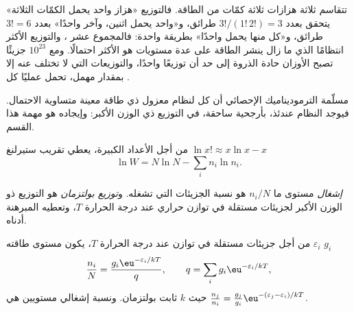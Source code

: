 \begin{example}\label{ex:b3:partition-functions:three-quanta}
تتقاسم ثلاثة هزازات ثلاثة كمّات من الطاقة. فالتوزيع «هزاز
واحد يحمل الكمّات الثلاثة» يتحقق بعدد $3!/(1!\,2!) = 3$ طرائق، و«واحد
يحمل اثنين، وآخر واحدًا» بعدد $3! = 6$ طرائق، و«كل منها يحمل واحدًا» بطريقة واحدة:
فالمجموع عشر ، والتوزيع الأكثر انتظامًا الذي ما زال ينشر
الطاقة على عدة مستويات هو الأكثر احتمالًا. ومع $10^{23}$ جزيئًا تصبح
الأوزان حادة الذروة إلى حد أن توزيعًا واحدًا، والتوزيعات التي لا تختلف
عنه إلا بمقدار مهمل، تحمل عمليًا كل .
\end{example}

\begin{remark}
مسلّمة الترموديناميك الإحصائي أن كل  لنظام
معزول ذي طاقة معينة متساوية الاحتمال. فيوجد النظام عندئذ،
بأرجحية ساحقة، في التوزيع ذي الوزن الأكبر: وإيجاده هو
مهمة هذا القسم.
\end{remark}

من أجل الأعداد الكبيرة، يعطي تقريب ستيرلنغ $\ln x! \approx x\ln x - x$
\[
  \ln W = N\ln N - \sum_i n_i\ln n_i .
\]

\begin{definition}\label{def:b3:partition-functions:boltzmann}
\emph{إشغال} مستوى ما $n_i/N$ هو نسبة
الجزيئات التي تشغله. و\emph{توزيع بولتزمان}
هو التوزيع ذو الوزن الأكبر لجزيئات مستقلة في
توازن حراري عند درجة الحرارة $T$، وتعطيه المبرهنة أدناه.
\end{definition}

\begin{theorem}\label{thm:b3:partition-functions:boltzmann}
من أجل جزيئات مستقلة في توازن عند درجة الحرارة $T$، يكون 
مستوى طاقته $\varepsilon_i$  $g_i$
\[
  \frac{n_i}{N} = \frac{g_i\eu^{-\varepsilon_i/kT}}{q},
  \qquad q = \sum_i g_i\eu^{-\varepsilon_i/kT},
\]
حيث $k$ ثابت بولتزمان. ونسبة إشغالي مستويين هي
$\frac{n_j}{n_i} = \frac{g_j}{g_i}\eu^{-(\varepsilon_j - \varepsilon_i)/kT}$.
\end{theorem}

